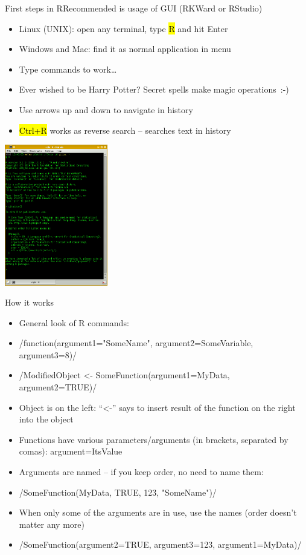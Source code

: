 \documentclass[compress, ucs, xelatex, 11pt, xcolor=svgnames,
  hyperref={
    bookmarks=true,
    unicode=true,
    colorlinks=true,
    pdftitle={Molecular data in R},
    plainpages=false,
    pdfauthor={Vojtech Zeisek},
    pdfsubject={Course about phylogeny and evolution in R},
    pdfcreator={XeLaTeX},
    pdfkeywords={R, evolution, phylogeny, molecular data},
    linkcolor=Tomato,
    anchorcolor=SaddleBrown,
    citecolor=Goldenrod,
    filecolor=DarkMagenta,
    menucolor=Sienna,
    urlcolor=DarkTurquoise,
    pdftex},
  url={hyphens, lowtilde} %
  ]{beamer}
\renewcommand{\texttt}[1]{\hl{\ttfamily #1}}
\begin{document}
\begin{frame}{First steps in R}{Recommended is usage of GUI (RKWard or RStudio)}
\begin{multicols}{2}
  \begin{itemize}
    \item Linux (UNIX): open any terminal, type \texttt{R} and hit Enter
    \item Windows and Mac: find it as normal application in menu
    \item Type commands to work\ldots
    \item \alert{Ever wished to be Harry Potter? Secret spells make magic operations~:-)}
    \item Use arrows up and down to navigate in history
    \item \texttt{Ctrl+R} works as reverse search -- searches text in history
  \end{itemize}
  \columnbreak
  \includegraphics[width=4.5cm]{rkonsole.png}
\end{multicols}
\end{frame}

\begin{frame}{How it works}
\begin{itemize}
 \item General look of R commands:
 \item \splus/function(argument1="SomeName", argument2=SomeVariable, argument3=8)/
 \item \splus/ModifiedObject <- SomeFunction(argument1=MyData, argument2=TRUE)/
 \item Object is on the left: ``<-'' says to insert result of the function on the right into the object
 \item Functions have various parameters/arguments (in brackets, separated by comas): argument=ItsValue
 \item Arguments are named -- if you keep order, no need to name them:
 \item \splus/SomeFunction(MyData, TRUE, 123, "SomeName")/
 \item When only some of the arguments are in use, use the names (order doesn't matter any more)
 \item \splus/SomeFunction(argument2=TRUE, argument3=123, argument1=MyData)/
\end{itemize}
\end{frame}
\end{document}
